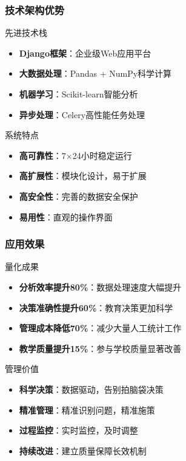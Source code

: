 \documentclass[aspectratio=169]{beamer}
\begin{document}
\begin{frame}
    \frametitle{技术架构优势}
    \begin{block}{先进技术栈}
        \begin{itemize}
            \item \textbf{Django框架}：企业级Web应用平台
            \item \textbf{大数据处理}：Pandas + NumPy科学计算
            \item \textbf{机器学习}：Scikit-learn智能分析
            \item \textbf{异步处理}：Celery高性能任务处理
        \end{itemize}
    \end{block}
    
    \begin{block}{系统特点}
        \begin{itemize}
            \item \textbf{高可靠性}：7×24小时稳定运行
            \item \textbf{高扩展性}：模块化设计，易于扩展
            \item \textbf{高安全性}：完善的数据安全保护
            \item \textbf{易用性}：直观的操作界面
        \end{itemize}
    \end{block}
\end{frame}

\begin{frame}
    \frametitle{应用效果}
    \begin{block}{量化成果}
        \begin{itemize}
            \item \textcolor{accentgreen}{\textbf{分析效率提升80\%}}：数据处理速度大幅提升
            \item \textcolor{accentgreen}{\textbf{决策准确性提升60\%}}：教育决策更加科学
            \item \textcolor{accentgreen}{\textbf{管理成本降低70\%}}：减少大量人工统计工作
            \item \textcolor{accentgreen}{\textbf{教学质量提升15\%}}：参与学校质量显著改善
        \end{itemize}
    \end{block}
    
    \begin{block}{管理价值}
        \begin{itemize}
            \item \textbf{科学决策}：数据驱动，告别拍脑袋决策
            \item \textbf{精准管理}：精准识别问题，精准施策
            \item \textbf{过程监控}：实时监控，及时调整
            \item \textbf{持续改进}：建立质量保障长效机制
        \end{itemize}
    \end{block}
\end{frame}
\end{document}
